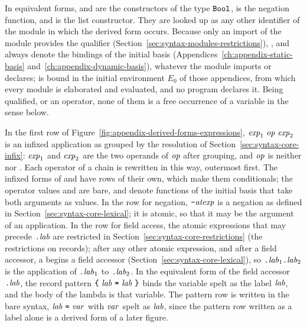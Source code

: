 In equivalent forms,  and  are the
constructors of the type $\mathtt{Bool}$,  is the negation
function, and \kw{::} is the list constructor. They are looked up as any
other identifier of the module in which the derived form occurs. Because
only an import of the module  provides the qualifier 
(Section~\ref{sec:syntax-modules-restrictions}), ,
 and  always denote the bindings of the
initial basis (Appendices~\ref{ch:appendix-static-basis}
and~\ref{ch:appendix-dynamic-basis}), whatever the module imports or
declares; \kw{::} is bound in the initial environment $E_0$ of those
appendices, from which every module is elaborated and evaluated, and no
program declares it. Being qualified, or an operator, none of them is a free
occurrence of a variable in the sense below.

In the first row of Figure~\ref{fig:appendix-derived-forms-expressions},
$\mathit{exp}_1\ \mathit{op}\ \mathit{exp}_2$ is an infixed application as grouped by the
resolution of Section~\ref{sec:syntax-core-infix}: $\mathit{exp}_1$ and $\mathit{exp}_2$
are the two operands of $\mathit{op}$ after grouping, and $\mathit{op}$ is neither \kw{\&\&}
nor \kw{||}. Each operator of a chain is rewritten in this way, outermost
first. The infixed forms of \kw{\&\&} and \kw{||} have rows of their own, which
make them conditionals; the operator values \kw{(\&\&)} and \kw{(||)} are
bare, and denote functions of the initial basis that take both arguments as
values. %
In the row for negation, $\textnormal{\texttt{-}}\mathit{atexp}$ is a negation as defined in
Section~\ref{sec:syntax-core-lexical}; it is atomic, so that it may be the
argument of an application. %
In the row for field access, the atomic expressions that may precede
$\textnormal{\texttt{.}}\mathit{lab}$ are restricted in Section~\ref{sec:syntax-core-restrictions}
(the restrictions on records); after any other atomic expression, and after a
field accessor, a  begins a field accessor
(Section~\ref{sec:syntax-core-lexical}), so $\textnormal{\texttt{.}}\mathit{lab}_1\textnormal{\texttt{.}}\mathit{lab}_2$ is the
application of $\textnormal{\texttt{.}}\mathit{lab}_1$ to $\textnormal{\texttt{.}}\mathit{lab}_2$.
In the equivalent form of the field accessor $\textnormal{\texttt{.}}\mathit{lab}$, the record pattern
$\kw{\kwlb}\ \lab\ \kw{=}\ \lab\ \kw{\kwrb}$ binds the variable spelt as the
label $\mathit{lab}$, and the body of the lambda is that variable. The pattern row is
written in the bare syntax, $\mathit{lab}\ \textnormal{\texttt{=}}\ \mathit{var}$ with $\mathit{var}$ spelt as $\mathit{lab}$,
since the pattern row written as a label alone is a derived form of a later
figure. %

